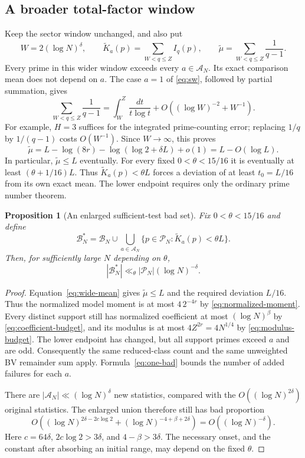 \documentclass[11pt]{article}
\newtheorem{proposition}[theorem]{Proposition}
\theoremstyle{remark}\newtheorem{remark}[theorem]{Remark}
\newcommand{\cP}{\mathcal P}
\newcommand{\cA}{\mathcal A}
\newcommand{\cB}{\mathcal B}
\begin{document}
\subsection{A broader total-factor window}
Keep the sector window unchanged, and also put
\begin{equation}\label{eq:wide-definition}
 W=2(\log N)^\delta,\qquad
 \widetilde K_a(p)=\sum_{W<q\le Z}I_q(p),\qquad
 \widetilde\mu=\sum_{W<q\le Z}\frac1{q-1}.
\end{equation}
Every prime in this wider window exceeds every $a\in\cA_N$.
Its exact comparison mean does not depend on $a$.
The case $a=1$ of \eqref{eq:sw}, followed by partial summation, gives
\[
 \sum_{W<q\le Z}\frac1{q-1}
 =\int_W^Z\frac{dt}{t\log t}
       +O((\log W)^{-2}+W^{-1}).
\]
For example, $H=3$ suffices for the integrated prime-counting error;
replacing $1/q$ by $1/(q-1)$ costs $O(W^{-1})$.
Since $W\to\infty$, this proves
\begin{equation}\label{eq:wide-mean}
 \widetilde\mu
 =L-\log(8r)-\log(\log2+\delta L)+o(1)
 =L-O(\log L).
\end{equation}
In particular, $\widetilde\mu\le L$ eventually. For every fixed
$0<\theta<15/16$ it is eventually at least $(\theta+1/16)L$.
Thus $\widetilde K_a(p)<\theta L$ forces a deviation of at least
$t_0=L/16$ from its own exact mean. The lower endpoint requires only the ordinary prime number theorem.

\begin{proposition}[An enlarged sufficient-test bad set]\label{prop:wide}
Fix $0<\theta<15/16$ and define
\begin{equation}\label{eq:wide-badset}
 \cB_N^*=\cB_N\cup
 \bigcup_{a\in\cA_N}
       \{p\in\cP_N:\widetilde K_a(p)<\theta L\}.
\end{equation}
Then, for sufficiently large $N$ depending on $\theta$,
\[
 |\cB_N^*|\ll_\theta |\cP_N|(\log N)^{-\delta}.
\]
\end{proposition}
\begin{proof}
Equation~\eqref{eq:wide-mean} gives $\widetilde\mu\le L$ and the
required deviation $L/16$. Thus the normalized model moment is at most
$4\,2^{-4r}$ by \eqref{eq:normalized-moment}. Every distinct support
still has normalized coefficient at most $(\log N)^\beta$ by
\eqref{eq:coefficient-budget}, and its modulus is at most
$4Z^{2r}=4N^{1/4}$ by \eqref{eq:modulus-budget}. The lower endpoint has
changed, but all support primes exceed $a$ and are odd. Consequently
the same reduced-class count and the same unweighted BV remainder sum
apply. Formula~\eqref{eq:one-bad} bounds the number of added failures
for each $a$.

There are $|\cA_N|\ll(\log N)^\delta$ new statistics, compared with
the $O((\log N)^{2\delta})$ original statistics. The enlarged union
therefore still has bad proportion
\[
 O\!\left((\log N)^{2\delta-2c\log2}
          +(\log N)^{-4+\beta+2\delta}\right)
 =O((\log N)^{-\delta}).
\]
Here $c=64\delta$, $2c\log2>3\delta$, and $4-\beta>3\delta$.
The necessary onset, and the constant after absorbing an initial
range, may depend on the fixed $\theta$.
\end{proof}
\end{document}

